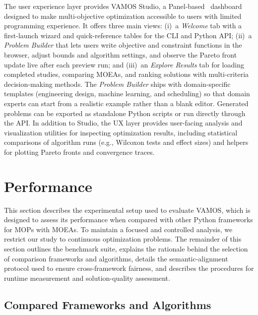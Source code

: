 \documentclass[final,5p,times,twocolumn]{elsarticle}
\newcommand{\VAMOS}{VAMOS}
\begin{document}
The user experience layer provides \VAMOS{} Studio, a Panel-based~\cite{panel24} dashboard designed to make multi-objective optimization accessible to users with limited programming experience. It offers three main views: (i)~a \textit{Welcome} tab with a first-launch  wizard and quick-reference tables for the CLI and Python API; (ii)~a \textit{Problem Builder} that lets users write objective and constraint functions in the browser, adjust bounds and algorithm settings, and observe the Pareto front update live after each preview run; and (iii)~an \textit{Explore Results} tab for loading completed studies, comparing MOEAs, and ranking solutions with multi-criteria decision-making methods. The \textit{Problem Builder} ships with domain-specific templates (engineering design, machine learning, and scheduling) so that domain experts can start from a realistic example rather than a blank editor. Generated problems can be exported as standalone Python scripts or run directly through the API. In addition to Studio, the UX layer provides user-facing analysis and visualization utilities for inspecting optimization results, including statistical comparisons of algorithm runs (e.g., Wilcoxon tests and effect sizes) and helpers for plotting Pareto fronts and convergence traces.



\section{Performance}
\label{sec:performance}

This section describes the experimental setup used to evaluate \VAMOS{}, which is designed to assess its performance when compared with other Python frameworks for MOPs with MOEAs. To maintain a focused and controlled analysis, we restrict our study to continuous optimization problems. The remainder of this section outlines the benchmark suite, explains the rationale behind the selection of comparison frameworks and algorithms, details the semantic-alignment protocol used to ensure cross-framework fairness, and describes the procedures for runtime measurement and solution-quality assessment.

\subsection{Compared Frameworks and Algorithms}
\end{document}
